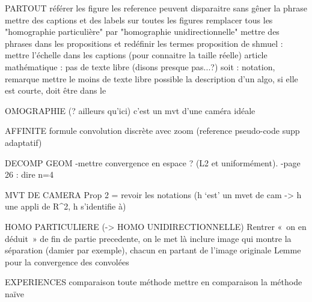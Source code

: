 PARTOUT
	référer les figure
	les reference peuvent disparaitre sans gêner la phrase
	mettre des captions et des labels sur toutes les figures
	remplacer tous les "homographie particulière" par "homographie unidirectionnelle"
	mettre des phrases dans les propositions et redéfinir les termes
	proposition de shmuel : mettre l'échelle dans les captions (pour connaitre la taille réelle)
	article mathématique : pas de texte libre (disons presque pas...?)
		soit : notation, remarque
	mettre le moins de texte libre possible
	la description d'un algo, si elle est courte, doit être dans le \caption







HOMOGRAPHIE (? ailleurs qu'ici)
	c’est un mvt d’une caméra idéale



AFFINITE
	formule convolution discrète avec zoom (reference pseudo-code supp adaptatif)


DECOMP GEOM 
	-mettre convergence en espace ? (L2 et uniformément).
	-page 26 : dire n=4


MVT DE CAMERA
	Prop 2 = revoir les notations (h ‘est’ un mvet de cam -> h une appli de R^2, h s'identifie à)


HOMO PARTICULIERE (-> HOMO UNIDIRECTIONNELLE)
	Rentrer « on en déduit » de fin de partie precedente, on le met là
	inclure image qui montre la séparation (damier par exemple), chacun en partant de l'image originale
	Lemme pour la convergence des convolées



EXPERIENCES
	comparaison toute méthode
	mettre en comparaison la méthode naïve
